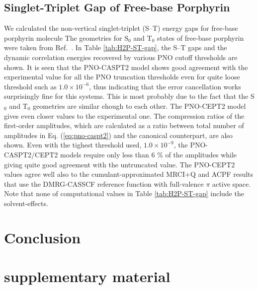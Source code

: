 \documentclass[aip,jcp,amsmath]{revtex4-1}
\begin{document}
\subsection{Singlet-Triplet Gap of Free-base Porphyrin}
%
We calculated the non-vertical singlet-triplet (S--T) energy gaps for free-base porphyrin molecule
%
The geometries for $\text{S}_0$ and $\text{T}_0$ states of free-base porphyrin were taken from Ref.~.
%
In Table \ref{tab:H2P-ST-gap}, the S--T gaps and the dynamic correlation energies recovered by various PNO cutoff thresholds are shown.
%
It is seen that the PNO-CASPT2 model shows good agreement with the experimental value for all the PNO truncation thresholds even for quite loose threshold such as $1.0\times 10^{-6}$, thus indicating that the error cancellation works surprisingly fine for this systems.
%
This is most probably due to the fact that the S${}_0$ and T${}_0$ geometries are similar ehough to each other.
%
The PNO-CEPT2 model gives even closer values to the experimental one.
%
The compression ratios of the first-order amplitudes, which are calculated as a ratio between total number of amplitudes in Eq. (\ref{eq:pno-caspt2}) and the canonical counterpart, are also shown.
%
Even with the tighest threshold used, $1.0\times 10^{-9}$, the PNO-CASPT2/CEPT2 models require only less than 6 $\%$ of the amplitudes while giving quite good agreement with the untruncated value.
%
The PNO-CEPT2 values agree well also to the cumulant-approximated MRCI+Q and ACPF results that use the DMRG-CASSCF reference function with full-valence $\pi$ active space.
%
Note that none of computational values in Table \ref{tab:H2P-ST-gap} include the solvent-effects.

\section{Conclusion}\label{Sec:Conclusion}

\section*{supplementary material}

\begin{acknowledgments}  
  
\end{acknowledgments}



\end{document}
